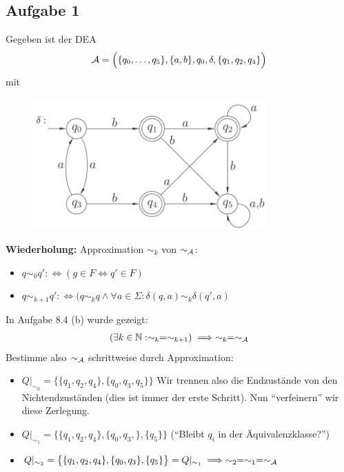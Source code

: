 \subsection{Aufgabe 1}
Gegeben ist der DEA
\begin{align*}
	\mathcal{A}=\Big(\lbrace q_0,\ldots,q_5\rbrace,\lbrace a,b\rbrace,q_0,\delta,\lbrace q_1,q_2,q_4\rbrace\Big)
\end{align*}
mit
\begin{figure}[H] 
	\begin{center}
		\includegraphics[width=0.8\textwidth]{pics/Blatt9.png}
	\end{center}
\end{figure}

\textbf{Wiederholung:} Approximation $\sim_k$ von $\sim_{\mathcal{A}}$:
\begin{itemize}
	\item $q\sim_0 q':\Longleftrightarrow (g\in F\Leftrightarrow q'\in F)$
	\item $q\sim_{k+1} q':\Longleftrightarrow(q\sim_k q\wedge\forall a\in\Sigma:\delta(q,a)\sim_k\delta(q',a)$
\end{itemize}
In Aufgabe 8.4 (b) wurde gezeigt:
\begin{align*}
	(\exists k\in\mathbb{N}:\sim_k=\sim_{k+1})\implies\sim_k=\sim_{\mathcal{A}}
\end{align*}
Bestimme also $\sim_{\mathcal{A}}$ schrittweise durch Approximation:
\begin{itemize}
	\item $Q|_{\sim_0}=\big\lbrace\lbrace q_1,q_2,q_4\rbrace,\lbrace q_0,q_3,q_5\rbrace\big\rbrace$ Wir trennen also die Endzustände von den Nichtendzuständen (dies ist immer der erste Schritt). Nun ``verfeinern'' wir diese Zerlegung.
	\item $Q|_{\sim_1}=\big\lbrace\lbrace q_1,q_2,q_4\rbrace,\lbrace q_0,q_3,\rbrace,\lbrace q_5\rbrace\big\rbrace$ (``Bleibt $q_i$ in der Äquivalenzklasse?'')
	\item $Q|_{\sim_2}=\big\lbrace\lbrace q_1,q_2,q_4\rbrace,\lbrace q_0,q_3\rbrace,\lbrace q_5\rbrace\big\rbrace=Q|_{\sim_1}\implies \sim_2=\sim_1=\sim_{\mathcal{A}}$ 
\end{itemize}

